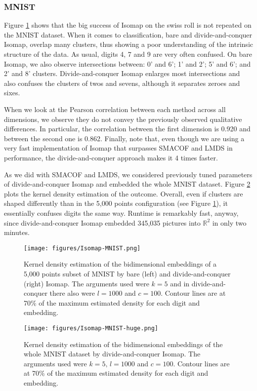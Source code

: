 \subsubsection{MNIST}

Figure \ref{fig:Isomap-MNIST} shows that the big success of Isomap on the swiss roll is not repeated on the MNIST dataset. When it comes to classification, bare and divide-and-conquer Isomap, overlap many clusters, thus showing a poor understanding of the intrinsic structure of the data. As usual, digits 4, 7 and 9 are very often confused. On bare Isomap, we also observe intersections between: 0' and 6'; 1' and 2'; 5' and 6'; and 2' and 8' clusters. Divide-and-conquer Isomap enlarges most intersections and also confuses the clusters of twos and sevens, although it separates zeroes and sixes.

When we look at the Pearson correlation between each method across all dimensions, we observe they do not convey the previously observed qualitative differences. In particular, the correlation between the first dimension is 0.920 and between the second one is 0.862. Finally, note that, even though we are using a very fast implementation of Isomap that surpasses SMACOF and LMDS in performance, the divide-and-conquer approach makes it 4 times faster.

As we did with SMACOF and LMDS, we considered previously tuned parameters of divide-and-conquer Isomap and embedded the whole MNIST dataset. Figure \ref{fig:Isomap-MNIST-huge} plots the kernel density estimation of the outcome. Overall, even if clusters are shaped differently than in the 5,000 points configuration (see Figure \ref{fig:Isomap-MNIST}), it essentially confuses  digits the same way. Runtime is remarkably fast, anyway, since divide-and-conquer Isomap embedded 345,035 pictures into $\mathbb{R}^2$ in only two minutes.

\begin{figure}
    \centering
    \texttt{[image: figures/Isomap-MNIST.png]}
    \caption{Kernel density estimation of the bidimensional embeddings of a 5,000 points subset of MNIST by bare (left) and divide-and-conquer (right) Isomap. The arguments used were $k=5$ and in divide-and-conquer there also were $l=1000$ and $c=100$. Contour lines are at 70\% of the maximum estimated density for each digit and embedding.}
    \label{fig:Isomap-MNIST}
\end{figure}

\begin{figure}
    \centering
    \texttt{[image: figures/Isomap-MNIST-huge.png]}
    \caption{Kernel density estimation of the bidimensional embeddings of the whole MNIST dataset by divide-and-conquer Isomap. The arguments used were $k=5, \, l=1000$ and $c=100$. Contour lines are at 70\% of the maximum estimated density for each digit and embedding.}
    \label{fig:Isomap-MNIST-huge}
\end{figure}

